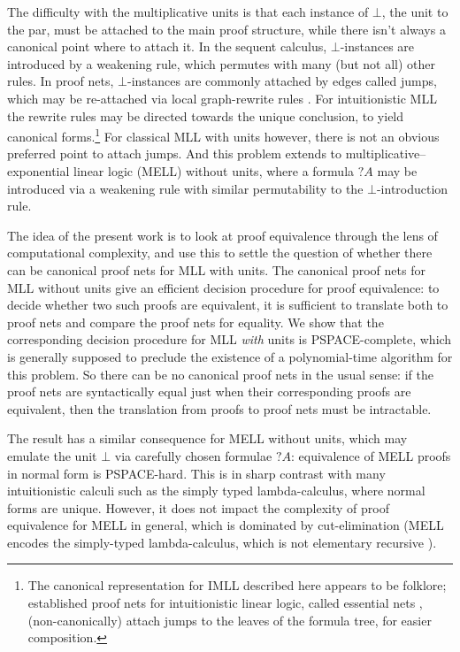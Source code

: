 \documentclass{lmcs}
\let\capsabbrev=\uppercase
\begin{document}
The difficulty with the multiplicative units is that each instance of $\bot$, the unit to the par, must be attached to the main proof structure, while there isn't always a canonical point where to attach it. In the sequent calculus, $\bot$-instances are introduced by a weakening rule, which permutes with many (but not all) other rules. In proof nets, $\bot$-instances are commonly attached by edges called jumps, which may be re-attached via local graph-rewrite rules \cite{Trimble-1994,Blute-Cockett-Seely-Trimble-1996}. For intuitionistic MLL the rewrite rules may be directed towards the unique conclusion, to yield canonical forms.\footnote{The canonical representation for IMLL described here appears to be folklore; established proof nets for intuitionistic linear logic, called essential nets \cite{Lamarche-2008,Murawsky-Ong-2003}, (non-canonically) attach jumps to the leaves of the formula tree, for easier composition.}
For classical MLL with units however, there is not an obvious preferred point to attach jumps. And this problem extends to multiplicative--exponential linear logic (MELL) without units, where a formula $?A$ may be introduced via a weakening rule with similar permutability to the $\bot$-introduction rule.


The idea of the present work is to look at proof equivalence through the lens of computational
complexity, and use this to settle the question of whether there can be canonical proof nets
for \capsabbrev{mll} with units. The canonical proof nets for \capsabbrev{mll} without units
give an efficient decision procedure for proof equivalence: to decide whether two such proofs
are equivalent, it is sufficient to translate both to proof nets and compare the proof nets
for equality.
%
We show that the corresponding decision procedure for \capsabbrev{mll} \emph{with} units is
\capsabbrev{pspace}-complete, which is generally supposed to preclude the existence of a
polynomial-time algorithm for this problem. So there can be no canonical proof nets in the
usual sense: if the proof nets are syntactically equal just when their corresponding proofs
are equivalent, then the translation from proofs to proof nets must be intractable.



The result has a similar consequence for MELL without units, which may emulate the unit $\bot$ via carefully chosen formulae $?A$: equivalence of MELL proofs in normal form is \capsabbrev{pspace}-hard. This is in sharp contrast with many intuitionistic calculi such as the simply typed lambda-calculus, where normal forms are unique. However, it does not impact the complexity of proof equivalence for MELL in general, which is dominated by cut-elimination (MELL encodes the simply-typed lambda-calculus, which is not elementary recursive \cite{Statman-1977}).
\end{document}
